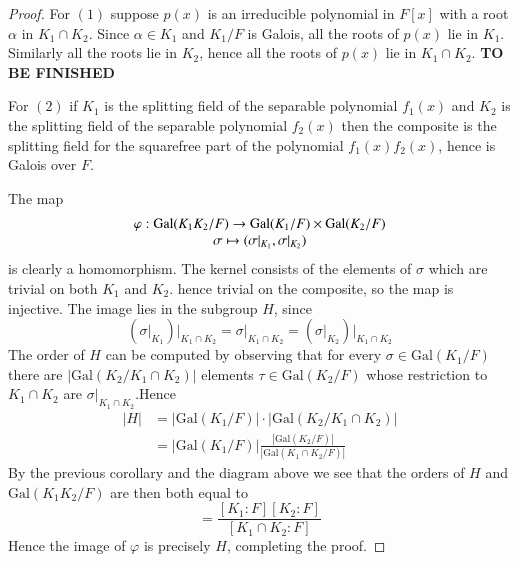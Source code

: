 \documentclass[12pt, a4paper, oneside, openright, titlepage]{book}
\begin{document}
\begin{proof}
    For $(1)$ suppose $p(x)$ is an irreducible polynomial in $F[x]$ with a root $\alpha$ in $K_1\cap K_2$. Since $\alpha \in K_1$ and $K_1/F$ is Galois, all the roots of $p(x)$ lie in $K_1$. Similarly all the roots lie in $K_2$, hence all the roots of $p(x)$ lie in $K_1\cap K_2$. \textbf{TO BE FINISHED}

    For $(2)$ if $K_1$ is the splitting field of the separable polynomial $f_1(x)$ and $K_2$ is the splitting field of the separable polynomial $f_2(x)$ then the composite is the splitting field for the squarefree part of the polynomial $f_1(x)f_2(x)$, hence is Galois over $F$.

    The map \begin{equation*}
        \begin{array}{c} \varphi:\text{Gal}(K_1K_2/F)\rightarrow \text{Gal}(K_1/F)\times \text{Gal}(K_2/F) \\ \sigma \mapsto (\sigma\vert_{K_1},\sigma\vert_{K_2}) \end{array}
    \end{equation*}
    is clearly a homomorphism. The kernel consists of the elements of $\sigma$ which are trivial on both $K_1$ and $K_2$. hence trivial on the composite, so the map is injective. The image lies in the subgroup $H$, since \begin{equation*}
        (\sigma\vert_{K_1})\vert_{K_1\cap K_2} = \sigma\vert_{K_1\cap K_2} = (\sigma\vert_{K_2})\vert_{K_1\cap K_2}
    \end{equation*}
    The order of $H$ can be computed by observing that for every $\sigma \in \text{Gal}(K_1/F)$ there are $|\text{Gal}(K_2/K_1\cap K_2)|$ elements $\tau \in \text{Gal}(K_2/F)$ whose restriction to $K_1\cap K_2$ are $\sigma\vert_{K_1\cap K_2}$.Hence \begin{align*}
        |H| &= |\text{Gal}(K_1/F)|\cdot|\text{Gal}(K_2/K_1\cap K_2)| \\
        &= |\text{Gal}(K_1/F)|\frac{|\text{Gal}(K_2/F)|}{|\text{Gal}(K_1\cap K_2/F)|}
    \end{align*}
    By the previous corollary and the diagram above we see that the orders of $H$ and $\text{Gal}(K_1K_2/F)$ are then both equal to \begin{equation*}
        [K_1K_2:F] = \frac{[K_1:F][K_2:F]}{[K_1\cap K_2:F]}
    \end{equation*}
    Hence the image of $\varphi$ is precisely $H$, completing the proof.
\end{proof}
\end{document}
